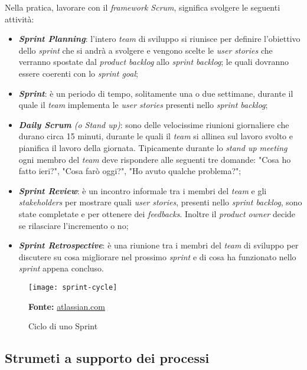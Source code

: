Nella pratica, lavorare con il \emph{framework Scrum}, significa svolgere le seguenti attività:
\begin{itemize}
  \item \textbf{\emph{Sprint Planning}}: l'intero \emph{team} di sviluppo si riunisce per definire l'obiettivo dello \emph{sprint} che si andrà a svolgere e vengono scelte le \emph{user stories} che verranno spostate dal \emph{product backlog} allo \emph{sprint backlog}; le quali dovranno essere coerenti con lo \emph{sprint goal};
  \item \textbf{\emph{Sprint}}: è un periodo di tempo, solitamente una o due settimane, durante il quale il \emph{team} implementa le \emph{user stories} presenti nello \emph{sprint backlog};
  \item \emph{\textbf{Daily Scrum} (o Stand up)}: sono delle velocissime riunioni giornaliere che durano circa 15 minuti, durante le quali il \emph{team} si allinea sul lavoro svolto e pianifica il lavoro della giornata. Tipicamente durante lo \emph{stand up meeting} ogni membro del \emph{team} deve rispondere alle seguenti tre domande: "Cosa ho fatto ieri?", "Cosa farò oggi?", "Ho avuto qualche problema?";
  \item \textbf{\emph{Sprint Review}}: è un incontro informale tra i membri del \emph{team} e gli \emph{\glspl{stakeholder}} per mostrare quali \emph{user stories}, presenti nello \emph{sprint backlog}, sono state completate e per ottenere dei \emph{feedbacks}. Inoltre il \emph{product owner} decide se rilasciare l'incremento o no;
  \item \textbf{\emph{Sprint Retrospective}}: è una riunione tra i membri del \emph{team} di sviluppo per discutere su cosa migliorare nel prossimo \emph{sprint} e di cosa ha funzionato nello \emph{sprint} appena concluso.
\end{itemize}

\clearpage

\vspace{20pt}
  \begin{figure}[!ht]
    \begin{center}
      \texttt{[image: sprint-cycle]}
      \caption{Ciclo di uno Sprint}
      \textbf{Fonte:} \href{https://www.atlassian.com}{atlassian.com}
    \end{center}
  \end{figure}
\vspace{20pt} 

\subsection{Strumeti a supporto dei processi}


